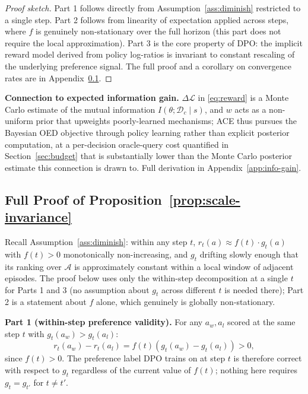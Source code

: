 \documentclass[twoside]{article}
\theoremstyle{plain}
\theoremstyle{definition}
\theoremstyle{remark}
\begin{document}
\begin{proof}[Proof sketch]
Part 1 follows directly from Assumption~\ref{ass:diminish} restricted to a single step. Part 2 follows from linearity of expectation applied across steps, where $f$ is genuinely non-stationary over the full horizon (this part does not require the local approximation). Part 3 is the core property of DPO: the implicit reward model derived from policy log-ratios is invariant to constant rescaling of the underlying preference signal. The full proof and a corollary on convergence rates are in Appendix~\ref{app:proof}.
\end{proof}

\textbf{Connection to expected information gain.} $\Delta\mathcal{L}$ in \eqref{eq:reward} is a Monte Carlo estimate of the mutual information $I(\theta; \mathcal{D}_c \mid s)$, and $w$ acts as a non-uniform prior that upweights poorly-learned mechanisms; ACE thus pursues the Bayesian OED objective \citep{toth2022active} through policy learning rather than explicit posterior computation, at a per-decision oracle-query cost quantified in Section~\ref{sec:budget} that is substantially lower than the Monte Carlo posterior estimate this connection is drawn to. Full derivation in Appendix~\ref{app:info-gain}.


\label{app:theory}

\subsection{Full Proof of Proposition~\ref{prop:scale-invariance}}
\label{app:proof}

Recall Assumption~\ref{ass:diminish}: within any step $t$, $r_t(a) \approx f(t) \cdot g_t(a)$ with $f(t) > 0$ monotonically non-increasing, and $g_t$ drifting slowly enough that its ranking over $\mathcal{A}$ is approximately constant within a local window of adjacent episodes. The proof below uses only the within-step decomposition at a single $t$ for Parts 1 and 3 (no assumption about $g_t$ across different $t$ is needed there); Part 2 is a statement about $f$ alone, which genuinely is globally non-stationary.

\textbf{Part 1 (within-step preference validity).} For any $a_w, a_l$ scored at the same step $t$ with $g_t(a_w) > g_t(a_l)$:
\[r_t(a_w) - r_t(a_l) = f(t)(g_t(a_w) - g_t(a_l)) > 0,\]
since $f(t) > 0$. The preference label DPO trains on at step $t$ is therefore correct with respect to $g_t$ regardless of the current value of $f(t)$; nothing here requires $g_t = g_{t'}$ for $t \ne t'$.
\end{document}
